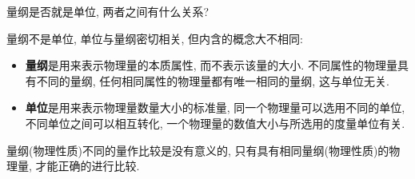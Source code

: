 \begin{problem}[01]
量纲是否就是单位, 两者之间有什么关系?
\end{problem}
\begin{solution}
量纲不是单位, 单位与量纲密切相关, 但内含的概念大不相同:
\begin{itemize}
\item \textbf{量纲}是用来表示物理量的本质属性, 而不表示该量的大小. 不同属性的物理量具有不同的量纲, 任何相同属性的物理量都有唯一相同的量纲, 这与单位无关.
\item \textbf{单位}是用来表示物理量数量大小的标准量, 同一个物理量可以选用不同的单位, 不同单位之间可以相互转化, 一个物理量的数值大小与所选用的度量单位有关.
\end{itemize}
量纲(物理性质)不同的量作比较是没有意义的, 只有具有相同量纲(物理性质)的物理量, 才能正确的进行比较. 
\end{solution}
